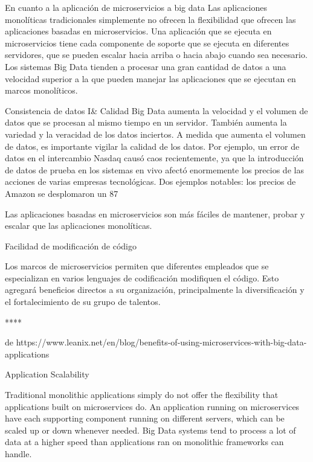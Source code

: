 En cuanto a la aplicación de microservicios a big data
Las aplicaciones monolíticas tradicionales simplemente no ofrecen la flexibilidad que ofrecen las aplicaciones basadas en microservicios. Una aplicación que se ejecuta en microservicios tiene cada componente de soporte que se ejecuta en diferentes servidores, que se pueden escalar hacia arriba o hacia abajo cuando sea necesario. Los sistemas Big Data tienden a procesar una gran cantidad de datos a una velocidad superior a la que pueden manejar las aplicaciones que se ejecutan en marcos monolíticos.\par
Consistencia de datos I\& Calidad
Big Data aumenta la velocidad y el volumen de datos que se procesan al mismo tiempo en un servidor. También aumenta la variedad y la veracidad de los datos inciertos. A medida que aumenta el volumen de datos, es importante vigilar la calidad de los datos. Por ejemplo, un error de datos en el intercambio Nasdaq causó caos recientemente, ya que la introducción de datos de prueba en los sistemas en vivo afectó enormemente los precios de las acciones de varias empresas tecnológicas. Dos ejemplos notables: los precios de Amazon se desplomaron un 87 %

Las aplicaciones basadas en microservicios son más fáciles de mantener, probar y escalar que las aplicaciones monolíticas.

Facilidad de modificación de código

Los marcos de microservicios permiten que diferentes empleados que se especializan en varios lenguajes de codificación modifiquen el código. Esto agregará beneficios directos a su organización, principalmente la diversificación y el fortalecimiento de su grupo de talentos.




\cite{Mauersberger2022Apr}
****

de https://www.leanix.net/en/blog/benefits-of-using-microservices-with-big-data-applications

Application Scalability

Traditional monolithic applications simply do not offer the flexibility that applications built on microservices do. An application running on microservices have each supporting component running on different servers, which can be scaled up or down whenever needed. Big Data systems tend to process a lot of data at a higher speed than applications ran on monolithic frameworks can handle.

